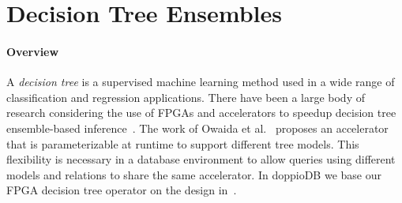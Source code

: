 \documentclass[11pt,dvipdfm]{article}
\begin{document}
\section{Decision Tree Ensembles}
\label{sec:dt}

\vspace{-.5em}
\paragraph{\textbf{Overview}}
A \emph{decision tree} is a supervised machine learning method used in a wide range of classification and regression applications. %
There have been a large body of research considering the use of FPGAs and accelerators to speedup decision tree ensemble-based inference~\cite{owaidafpl2017, owaidafpl2018,ObergFPL12,essenfccm12,yun2014}. The work of Owaida et al.~\cite{owaidafpl2017,owaidafpl2018} proposes an accelerator that is parameterizable at runtime to support different tree models. This flexibility is necessary in a database environment to allow queries using different models and relations to share the same accelerator. In doppioDB we base our FPGA decision tree operator on the design in~\cite{owaidafpl2017}.
\end{document}
